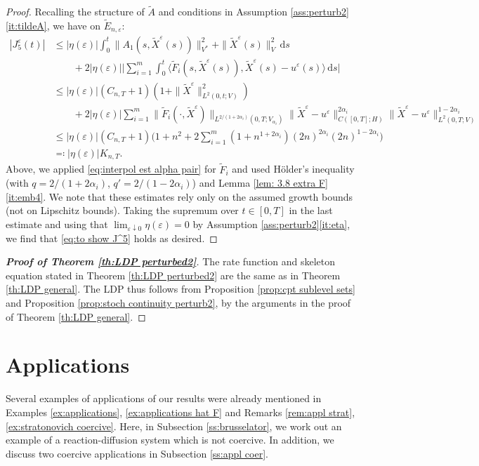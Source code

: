 \documentclass{amsart}
\newcommand{\dd}{\,\mathrm{d}}
\newcommand{\<}{\langle}
\newcommand{\?}{\rangle}
\newcommand{\eqqc}{\eqqcolon}
\theoremstyle{plain}
\theoremstyle{remark}
\theoremstyle{plain}
\numberwithin{equation}{section}
\newcommand{\eps}{\varepsilon}
\begin{document}
\begin{proof}
Recalling the structure of $\tilde{A}$ and conditions in Assumption \ref{ass:perturb2}\ref{it:tildeA},  we have on $\tilde{E}_{n,\eps}$:
\begin{align*}
  |J_5^\eps(t)|&\leq  |\eta(\eps)|\int_0^t \|A_1(s,\tilde{X}^\eps(s))\|_{V^*}^2+ \|\tilde{X}^\eps(s)\|_V^2\dd s\\
  &\qquad + 2|\eta(\eps)|\Big|{\sum_{i=1}^m}\int_0^t \<\tilde{F}_i(s,\tilde{X}^\eps(s)),\tilde{X}^\eps(s)-u^{\eps}(s)\big\?\dd s\Big|\\
   &\leq |\eta(\eps)|  (C_{n,T}+1)(1+\|\tilde{X}^\eps\|_{L^2(0,t;V)}^2)\\
   &\qquad+2|\eta(\eps)| {\sum_{i=1}^m}\|\tilde{F}_i(\cdot,\tilde{X}^\eps)\|_{L^{2/(1+2\alpha_i)}(0,T;V_{\alpha_i})} \|\tilde{X}^\eps-u^{\eps}\|_{C([0,T];H)}^{2\alpha_i}\big\|\tilde{X}^\eps-u^{\eps}\big\|_{L^2(0,T;V)}^{1-2\alpha_i}
  \\
  &\leq |\eta(\eps)| (C_{n,T}+1)\big(1+n^2+  2\textstyle{\sum_{i=1}^m}(1+n^{1+2\alpha_i})(2n)^{2\alpha_i}(2n)^{1-2\alpha_i}\big) 
\\ 
&\eqqc |\eta(\eps)| K_{n,T}.
\end{align*}
Above, we applied \eqref{eq:interpol est alpha pair} for $\tilde{F}_i$ and used H\"older's inequality (with $q=2/(1+2\alpha_i)$, $q'=2/(1-2\alpha_i)$) and Lemma \ref{lem: 3.8 extra F}\ref{it:emb4}. We note that these estimates rely only on the assumed growth bounds (not on Lipschitz bounds).  
Taking the supremum over  $t\in[0,T]$ in the last estimate and using that $\lim_{\eps\downarrow0}\eta(\eps)=0$ by Assumption \ref{ass:perturb2}\ref{it:eta}, we find that \eqref{eq:to show J^5} holds  as desired. 
\end{proof}
 
\begin{proof}[\textbf{Proof of Theorem \ref{th:LDP perturbed2}}] 
The rate function and   skeleton equation stated in Theorem \ref{th:LDP perturbed2} are the same as in Theorem \ref{th:LDP general}. The LDP thus follows from Proposition \ref{prop:cpt sublevel sets} and Proposition \ref{prop:stoch continuity perturb2},  
by the   arguments in the proof of Theorem \ref{th:LDP general}. 
\end{proof} 
 
 

\section{Applications}\label{sec: brusselator}  

Several examples of applications of our results were already mentioned in Examples \ref{ex:applications}, \ref{ex:applications hat F} and Remarks \ref{rem:appl strat}, \ref{ex:stratonovich coercive}. 
Here, in Subsection \ref{ss:brusselator}, we work out an example of a reaction-diffusion system which is not coercive. In addition, we discuss two coercive applications in Subsection \ref{ss:appl coer}. 
\end{document}
